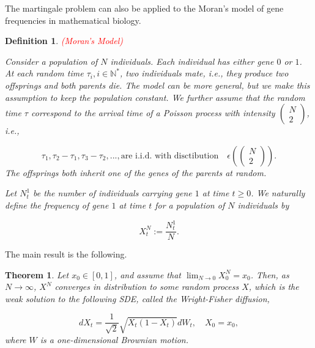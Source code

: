 \documentclass{article}
\newtheorem{definition}{Definition}
\newtheorem{theorem}{Theorem}
\begin{document}
The martingale problem can also be applied to the Moran's model of gene frequencies in mathematical biology. 

\begin{definition} \textcolor{red}{(Moran's Model)}

Consider a population of $N$ individuals. Each individual has either gene $0$ or $1$. At each random time $\tau_i, i\in\mathbb{N}^*$, two individuals mate, i.e., they produce two offsprings and both parents die. The model can be more general, but we make this assumption to keep the population constant. We further assume that the random time $\tau$ correspond to the arrival time of a Poisson process with intensity  
 $\begin{pmatrix}
  N\\ 
  2
\end{pmatrix}$, 
i.e., 

\begin{equation*}
\tau_1, \tau_2-\tau_1, \tau_3-\tau_2, ..., \text{are i.i.d. with disctibution} \quad
\epsilon\left(\begin{pmatrix}
  N\\ 
  2
\end{pmatrix}\right).
\end{equation*}
The offsprings both inherit one of the genes of the parents at random. 

Let $N^1_t$ be the number of individuals carrying gene $1$ at time $t\geq0$. We naturally define the
frequency of gene $1$ at time $t$ for a population of $N$ individuals by

\begin{equation*}
X_t^N:=\frac{N^1_t}{N}.
\end{equation*}

\end{definition}

The main result is the following.

\begin{theorem}
Let $x_0\in[0,1]$, and assume that $\lim_{N\rightarrow0}X_0^N=x_0$. Then, as $N\rightarrow\infty$, $X^N$ converges in distribution to some random process $X$, which is the weak solution to the following SDE, called the Wright-Fisher diffusion,

\begin{equation*}
dX_t=\frac{1}{\sqrt{2}}\sqrt{X_t(1-X_t)}dW_t, \quad X_0=x_0,
\end{equation*}
where $W$ is a one-dimensional Brownian motion.
\end{theorem}
\end{document}
